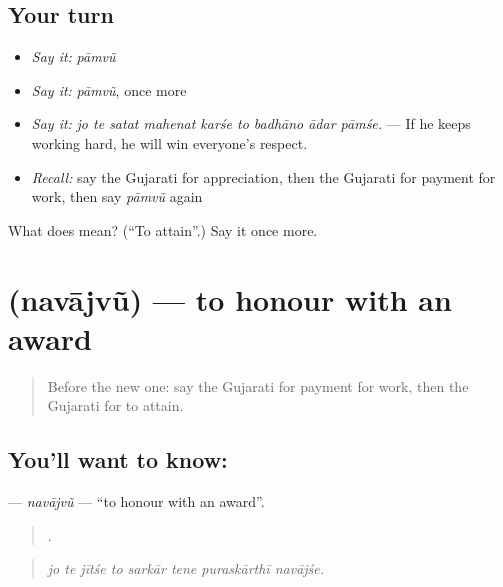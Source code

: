 \subsection*{Your turn}
\begin{itemize}
\raggedright
  \item \emph{Say it:} \emph{pāmvũ}
  \item \emph{Say it:} \emph{pāmvũ}, once more
  \item \emph{Say it:} \emph{jo te satat mahenat karśe to badhāno ādar pāmśe.} — If he keeps working hard, he will win everyone's respect.
  \item \emph{Recall:} say the Gujarati for appreciation, then the Gujarati for payment for work, then say \emph{pāmvũ} again
\end{itemize}

\begin{tcolorbox}[breakable,colback=teal!4,colframe=teal!35!black,title={Before you move on}]
What does  mean? (\textquotedblleft{}To attain\textquotedblright{}.) Say it once more.
\end{tcolorbox}
\section[\texorpdfstring{\gu{નવાજવું} (navājvũ)}{નવાજવું (navājvũ)}]{ (navājvũ) — to honour with an award}

\label{lesson:GU-C385-navajvu}



\begin{quote}
Before the new one: say the Gujarati for payment for work, then the Gujarati for to attain.
\end{quote}

\subsection*{You'll want to know: }
\textbf{} — \emph{navājvũ} — \textquotedblleft{}to honour with an award\textquotedblright{}.

\begin{quote}
       .
\end{quote}

\begin{quote}
\emph{jo te jītśe to sarkār tene puraskārthī navājśe.}
\end{quote}

